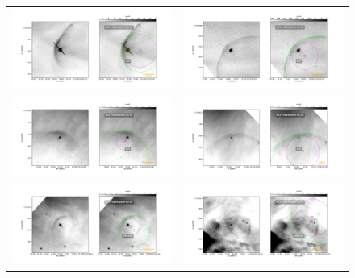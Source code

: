 \begin{figure}
  \centering
  \begin{tabular}{cc}
    \includegraphics[width=0.5\linewidth]{./Figures/LL1-Bally_01-images} & \includegraphics[width=0.5\linewidth]{./Figures/LL4-Bally_24-images} \\ \includegraphics[width=0.5\linewidth]{./Figures/LL5-Bally_07-images} &
    \includegraphics[width=0.5\linewidth]{./Figures/LL6-Bally_08-images} \\ \includegraphics[width=0.5\linewidth]{./Figures/042-628-Bally_16-images} & \includegraphics[width=0.5\linewidth]{./Figures/109-246-Bally_01-images} 

\end{tabular}
\end{figure}
